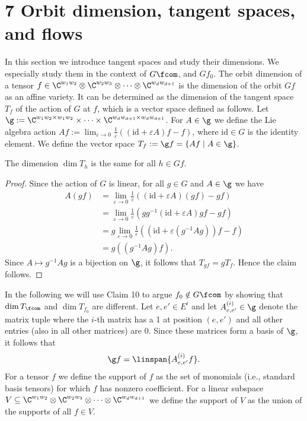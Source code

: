 \section*{7 Orbit dimension, tangent spaces, and flows}
In this section we introduce tangent spaces and study their dimensions. We especially study them in the context of $G\fcom$, and $Gf_0$.
The orbit dimension of a tensor $f\in\C^{w_1w_2}\otimes\C^{w_2w_3}\otimes\cdots\otimes\C^{w_dw_{d+1}}$ is the dimension of the orbit $Gf$ as an affine variety. It can be determined as the dimension of the tangent space $T_f$ of the action of $G$ at $f$, which is a vector space defined as follows. Let $\g:=\C^{w_1w_2\times w_1w_2}\times\cdots\times\C^{w_dw_{d+1}\times w_dw_{d+1}}$. For $A\in\g$ we define the Lie algebra action $Af:=\lim_{\varepsilon\to0}\frac1\varepsilon((\mathrm{id}+\varepsilon A)f-f)$, where $\mathrm{id}\in G$ is the identity element. We define the vector space $T_f:=\g f=\{Af\mid A\in\g\}$.
\begin{claim}The dimension $\dim T_h$ is the same for all $h\in Gf$.\end{claim}
\begin{proof}
Since the action of $G$ is linear, for all $g\in G$ and $A\in\g$ we have
\begin{align*}
A(gf)&=\lim_{\varepsilon\to0}\frac1\varepsilon((\mathrm{id}+\varepsilon A)(gf)-gf)\\
&=\lim_{\varepsilon\to0}\frac1\varepsilon(gg^{-1}(\mathrm{id}+\varepsilon A)gf-gf)\\
&=g\lim_{\varepsilon\to0}\frac1\varepsilon((\mathrm{id}+\varepsilon(g^{-1}Ag))f-f)\\
&=g((g^{-1}Ag)f).
\end{align*}
Since $A\mapsto g^{-1}Ag$ is a bijection on $\g$, it follows that $T_{gf}=gT_f$. Hence the claim follows.
\end{proof}
In the following we will use Claim 10 to argue $f_0\notin G\fcom$ by showing that $\dim T_{\fcom}$ and $\dim T_{f_0}$ are different.
Let $e,e'\in E^i$ and let $A^{(i)}_{e,e'}\in\g$ denote the matrix tuple where the $i$-th matrix has a 1 at position $(e,e')$ and all other entries (also in all other matrices) are 0. Since these matrices form a basis of $\g$, it follows that
\[\g f=\linspan\{A^{(i)}_{e,e'}f\}.\]
For a tensor $f$ we define the support of $f$ as the set of monomials (i.e., standard basis tensors) for which $f$ has nonzero coefficient. For a linear subspace $V\subseteq\C^{w_1w_2}\otimes\C^{w_2w_3}\otimes\cdots\otimes\C^{w_dw_{d+1}}$ we define the support of $V$ as the union of the supports of all $f\in V$.
